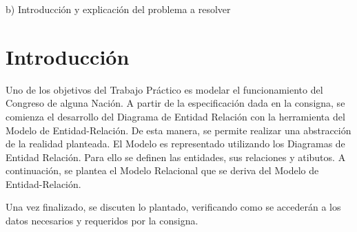 b) Introducción y explicación del problema a resolver

\section{Introducción}
Uno de los objetivos del Trabajo Práctico es modelar el funcionamiento del Congreso de alguna Nación.
A partir de la especificación dada en la consigna, se comienza el desarrollo del Diagrama de Entidad Relación
con la herramienta del Modelo de Entidad-Relación. De esta manera, se permite realizar una abstracción de la realidad planteada. El Modelo es representado utilizando los Diagramas de Entidad Relación. Para ello se definen las entidades, sus relaciones y atibutos. 
A continuación, se plantea el Modelo Relacional que se deriva del Modelo de Entidad-Relación. 

Una vez finalizado, se discuten lo plantado, verificando como se accederán a los datos necesarios y requeridos por la consigna.
